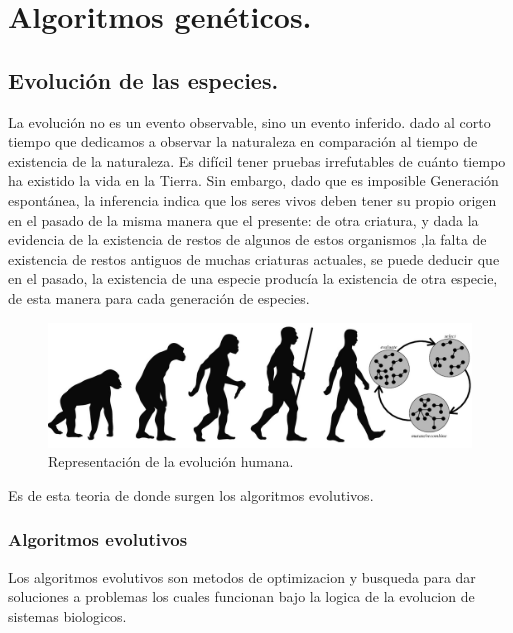 \documentclass[12pt,letterpaper]{report}
\begin{document}
\setcounter{chapter}{2}
\setcounter{section}{1}
\section{Algoritmos genéticos.}\label{cap.algoritmos_geneticos}

\subsection{Evolución de las especies.}
La evolución no es un evento observable, sino un evento inferido. dado al corto tiempo que dedicamos a observar la naturaleza en comparación al tiempo de existencia de la naturaleza. Es difícil tener pruebas irrefutables de cuánto tiempo ha existido la vida en la Tierra. Sin embargo, dado que es imposible Generación espontánea, la inferencia indica que los seres vivos deben tener su propio origen en el pasado de la misma manera que el presente: de otra criatura, y dada la evidencia de la existencia de restos de algunos de estos organismos ,la falta de existencia de restos antiguos de muchas criaturas actuales, se puede deducir que en el pasado, la existencia de una especie producía la existencia de otra especie, de esta manera para cada generación de especies.

\begin{figure}[!htb]
	\centering
	\includegraphics[width=\textwidth]{Img_C2_2.2/evolution.jpg} 
	\caption{Representación de la evolución humana.}
	\label{fig:evolucion}
\end{figure}



Es de esta teoria de donde surgen los algoritmos evolutivos.

\subsubsection{Algoritmos evolutivos}

Los algoritmos evolutivos son metodos de optimizacion y busqueda para dar soluciones a problemas los cuales funcionan bajo la logica de la evolucion de sistemas biologicos.
\end{document}
